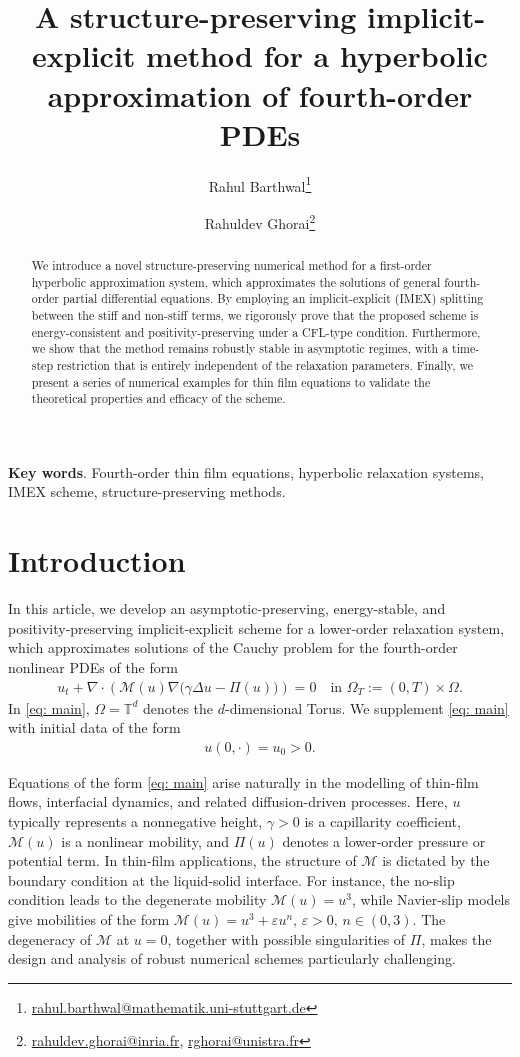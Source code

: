 \documentclass[11pt]{article}
\date{}
\title{A structure-preserving implicit-explicit method for a hyperbolic approximation of fourth-order PDEs}
\author[1]{Rahul Barthwal\thanks{\href{mailto:rahul.barthwal@mathematik.uni-stuttgart.de}{rahul.barthwal@mathematik.uni-stuttgart.de}}}
\author[2]{Rahuldev Ghorai\thanks{\href{mailto:rahuldev.ghorai@inria.fr}{rahuldev.ghorai@inria.fr}, 
\href{mailto:rghorai@unistra.fr}{rghorai@unistra.fr}}}
\affil[1]{\footnotesize Institute of Applied Analysis and Numerical Simulation, University of Stuttgart\\

Pfaffenwaldring 57, 70569 Stuttgart, Germany}
\affil[2]{\footnotesize Université de Strasbourg, CNRS, Inria, IRMA, F-67000, Strasbourg, France}
\numberwithin{equation}{section}
\newtheorem{counter example}[theorem]{Counter Example}
\numberwithin{equation}{section}
\numberwithin{equation}{section}
\begin{document}
\maketitle



\begin{abstract}
We introduce a novel structure-preserving numerical method for a first-order hyperbolic approximation system, which approximates the solutions of general fourth-order partial differential equations. By employing an implicit-explicit (IMEX) splitting between the stiff and non-stiff terms, we rigorously prove that the proposed scheme is energy-consistent and positivity-preserving under a CFL-type condition. Furthermore, we show that the method remains robustly stable in asymptotic regimes, with a time-step restriction that is entirely independent of the relaxation parameters. Finally, we present a series of numerical examples for thin film equations to validate the theoretical properties and efficacy of the scheme.
\end{abstract}
{\textbf{Key words}. Fourth-order thin film equations, hyperbolic relaxation systems, IMEX scheme, structure-preserving methods.}
\medskip 
\section{Introduction}
In this article, we develop an asymptotic-preserving, energy-stable, and positivity-preserving implicit-explicit scheme for a lower-order relaxation system, which approximates solutions of the Cauchy problem for the fourth-order nonlinear PDEs of the form
\begin{align}
\label{eq: main}
u_t + \nabla \cdot \left( \mathcal{M}(u)\nabla\big(\gamma \Delta u - \Pi(u)\big) \right) = 0
\quad \text{in } \Omega_T := (0,T) \times  \Omega.
\end{align}
In \eqref{eq: main}, $\Omega=\mathbb{T}^d$ denotes the $d$-dimensional Torus. We supplement \eqref{eq: main} with initial data of the form
\begin{align}\label{initial_data_main}
    u(0, \cdot)=u_0> 0.
\end{align} %

Equations of the form \eqref{eq: main} arise naturally in the modelling of thin-film flows, interfacial dynamics, and related diffusion-driven processes. Here, $u$ typically represents a nonnegative height, $\gamma>0$ is a capillarity coefficient, $\mathcal M(u)$ is a nonlinear mobility, and $\Pi(u)$ denotes a lower-order pressure or potential term. In thin-film applications, the structure of $\mathcal M$ is dictated by the boundary condition at the liquid-solid interface. For instance, the no-slip condition leads to the degenerate mobility $\mathcal M(u)=u^3$, while Navier-slip models give mobilities of the form $\mathcal M(u)=u^3+\varepsilon u^n,\, \varepsilon>0,\, n\in(0,3).$ The degeneracy of $\mathcal M$ at $u=0$, together with possible singularities of $\Pi$, makes the design and analysis of robust numerical schemes particularly challenging.
\end{document}
